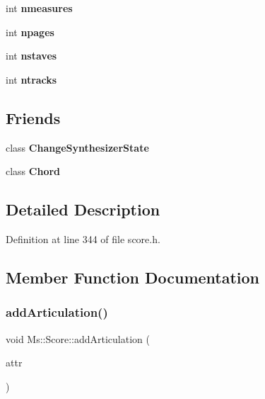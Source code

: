 \begin{DoxyCompactItemize}
\mbox{\label{class_ms_1_1_score_ad00f0f63521a6ff16cc056f4bb4f427d}} 
int {\bfseries nmeasures}
\item 
\mbox{\label{class_ms_1_1_score_a195dca9b1b7723e6c16877d98498dde0}} 
int {\bfseries npages}
\item 
\mbox{\label{class_ms_1_1_score_a9a57365ab6c124736b1c5fa0507671f0}} 
int {\bfseries nstaves}
\item 
\mbox{\label{class_ms_1_1_score_aab368312099ccba85cd4c6746bf76aa2}} 
int {\bfseries ntracks}
\end{DoxyCompactItemize}
\subsection*{Friends}
\begin{DoxyCompactItemize}
\item 
\mbox{\label{class_ms_1_1_score_aadd2df94d980026a94340005ffe51d48}} 
class {\bfseries Change\+Synthesizer\+State}
\item 
\mbox{\label{class_ms_1_1_score_ac7af8971e400658f64e6ddc407d27b05}} 
class {\bfseries Chord}
\end{DoxyCompactItemize}


\subsection{Detailed Description}


Definition at line 344 of file score.\+h.



\subsection{Member Function Documentation}
\mbox{\label{class_ms_1_1_score_aa8aee4a4a8019696426c48f33e540b53}} 
\subsubsection{\texorpdfstring{add\+Articulation()}{addArticulation()}}
{\footnotesize\ttfamily void Ms\+::\+Score\+::add\+Articulation (\begin{DoxyParamCaption}\item[{Sym\+Id}]{attr }\end{DoxyParamCaption})}

